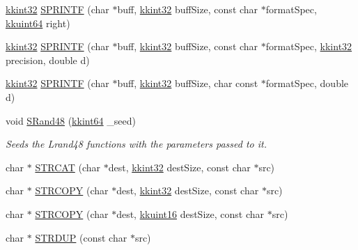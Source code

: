 \begin{DoxyCompactItemize}
\item 
\hyperlink{namespace_k_k_b_a8fa4952cc84fda1de4bec1fbdd8d5b1b}{kkint32} \hyperlink{namespace_k_k_b_a049b331ad63758ebb8b2619860c7d359}{S\+P\+R\+I\+N\+TF} (char $\ast$buff, \hyperlink{namespace_k_k_b_a8fa4952cc84fda1de4bec1fbdd8d5b1b}{kkint32} buff\+Size, const char $\ast$format\+Spec, \hyperlink{namespace_k_k_b_a1f2b0568d3b63cc7697dcff73250113e}{kkuint64} right)
\item 
\hyperlink{namespace_k_k_b_a8fa4952cc84fda1de4bec1fbdd8d5b1b}{kkint32} \hyperlink{namespace_k_k_b_a96de8cda5baf4912fcb3d2fc819a42f5}{S\+P\+R\+I\+N\+TF} (char $\ast$buff, \hyperlink{namespace_k_k_b_a8fa4952cc84fda1de4bec1fbdd8d5b1b}{kkint32} buff\+Size, const char $\ast$format\+Spec, \hyperlink{namespace_k_k_b_a8fa4952cc84fda1de4bec1fbdd8d5b1b}{kkint32} precision, double d)
\item 
\hyperlink{namespace_k_k_b_a8fa4952cc84fda1de4bec1fbdd8d5b1b}{kkint32} \hyperlink{namespace_k_k_b_a8e0b37f8ecc614eeda3fe341a7b14a4f}{S\+P\+R\+I\+N\+TF} (char $\ast$buff, \hyperlink{namespace_k_k_b_a8fa4952cc84fda1de4bec1fbdd8d5b1b}{kkint32} buff\+Size, char const $\ast$format\+Spec, double d)
\item 
void \hyperlink{namespace_k_k_b_ab78431731ee8aed1c90baf2248d85b67}{S\+Rand48} (\hyperlink{namespace_k_k_b_aa3486b1c5ea9162b3b020c69f72826eb}{kkint64} \+\_\+seed)
\begin{DoxyCompactList}\small\item\em Seeds the Lrand48 functions with the parameters passed to it. \end{DoxyCompactList}\item 
char $\ast$ \hyperlink{namespace_k_k_b_add907783ece6b98ee513a7df340f27f4}{S\+T\+R\+C\+AT} (char $\ast$dest, \hyperlink{namespace_k_k_b_a8fa4952cc84fda1de4bec1fbdd8d5b1b}{kkint32} dest\+Size, const char $\ast$src)
\item 
char $\ast$ \hyperlink{namespace_k_k_b_a9fae0fac72d1e210c67d62c4992847e0}{S\+T\+R\+C\+O\+PY} (char $\ast$dest, \hyperlink{namespace_k_k_b_a8fa4952cc84fda1de4bec1fbdd8d5b1b}{kkint32} dest\+Size, const char $\ast$src)
\item 
char $\ast$ \hyperlink{namespace_k_k_b_a5c53f9cd369733e7835ee7d1ebce7291}{S\+T\+R\+C\+O\+PY} (char $\ast$dest, \hyperlink{namespace_k_k_b_aa8c7d4d30381c8a0b6fce68974a9c8a9}{kkuint16} dest\+Size, const char $\ast$src)
\item 
char $\ast$ \hyperlink{namespace_k_k_b_a24920fb971ac6f99f94e9fb8ee8343d3}{S\+T\+R\+D\+UP} (const char $\ast$src)
\item 

\end{DoxyCompactItemize}
